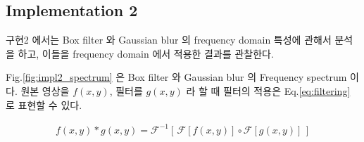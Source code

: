 \documentclass[a4paper, 12p]{paper}
\begin{document}
\subsection{Implementation 2}
구현2 에서는 Box filter 와 Gaussian blur 의 frequency domain 특성에 관해서 분석을 하고, 이들을 frequency domain 에서 적용한 결과를 관찰한다.

Fig.\ref{fig:impl2_spectrum} 은 Box filter 와 Gaussian blur 의 Frequency spectrum 이다. 원본 영상을 $f(x, y)$, 필터를 $g(x, y)$ 라 할 때 필터의 적용은 Eq.\ref{eq:filtering} 로 표현할 수 있다.

\begin{align}
 f(x, y) * g(x, y) = \mathcal{F}^{-1}[\, \mathcal{F}[f(x, y)] \circ \mathcal{F}[g(x, y)] \,]\label{eq:filtering}
\end{align}

\begin{figure}[H]
\centering
{}
\end{figure}
\end{document}
